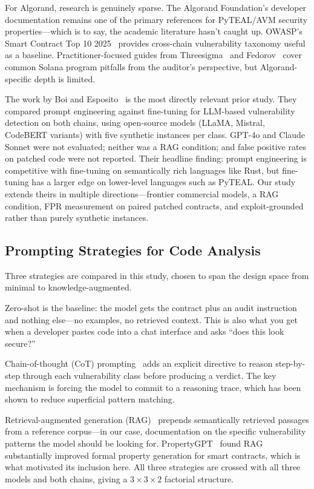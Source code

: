 \documentclass[journal]{IEEEtran}
\begin{document}
For Algorand, research is genuinely sparse.
The Algorand Foundation's developer documentation remains one of the primary
references for PyTEAL/AVM security properties---which is to say, the academic
literature hasn't caught up.
OWASP's Smart Contract Top 10 2025~\cite{owasp2025sc} provides cross-chain
vulnerability taxonomy useful as a baseline.
Practitioner-focused guides from Threesigma~\cite{threesigma2024solana} and
Fedorov~\cite{fedorov2024solana} cover common Solana program pitfalls from
the auditor's perspective, but Algorand-specific depth is limited.

The work by Boi and Esposito~\cite{boi2025prompt} is the most directly
relevant prior study.
They compared prompt engineering against fine-tuning for LLM-based vulnerability
detection on both chains, using open-source models (LLaMA, Mistral, CodeBERT
variants) with five synthetic instances per class.
GPT-4o and Claude Sonnet were not evaluated; neither was a RAG condition; and
false positive rates on patched code were not reported.
Their headline finding: prompt engineering is competitive with fine-tuning on
semantically rich languages like Rust, but fine-tuning has a larger edge on
lower-level languages such as PyTEAL.
Our study extends theirs in multiple directions---frontier commercial models,
a RAG condition, FPR measurement on paired patched contracts, and exploit-grounded
rather than purely synthetic instances.

\subsection{Prompting Strategies for Code Analysis}

Three strategies are compared in this study, chosen to span the design space
from minimal to knowledge-augmented.

Zero-shot is the baseline: the model gets the contract plus an audit
instruction and nothing else---no examples, no retrieved context.
This is also what you get when a developer pastes code into a chat interface
and asks ``does this look secure?''

Chain-of-thought (CoT) prompting~\cite{liu2024llm4vuln} adds an explicit
directive to reason step-by-step through each vulnerability class before
producing a verdict.
The key mechanism is forcing the model to commit to a reasoning trace,
which has been shown to reduce superficial pattern matching.

Retrieval-augmented generation (RAG)~\cite{sun2024propertygpt} prepends
semantically retrieved passages from a reference corpus---in our case,
documentation on the specific vulnerability patterns the model should be
looking for.
PropertyGPT~\cite{sun2024propertygpt} found RAG substantially improved formal
property generation for smart contracts, which is what motivated its inclusion
here.
All three strategies are crossed with all three models and both chains,
giving a $3 \times 3 \times 2$ factorial structure.
\end{document}
